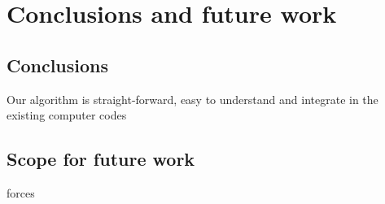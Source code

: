 \chapter{Conclusions and future work}
\label{Chapter6} %

\section{Conclusions}

Our algorithm is straight-forward, easy to understand and integrate in the existing computer codes

\section{Scope for future work}
forces